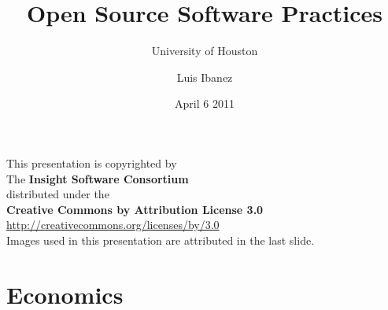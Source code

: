 \documentclass[18pt]{beamer}
\begin{document}
\title[Open Source]{Open Source Software Practices}
\subtitle[UH]{University of Houston}
\author[Luis Ibanez]{Luis Ibanez}
\date[April 2011]{April 6 2011}

\begin{frame}
\titlepage
\end{frame}


{
\begin{frame}[plain]
\center
\begin{center}
This presentation is copyrighted by\\
The \textbf{Insight Software Consortium}\\
\bigskip
distributed under the\\
\textbf{Creative Commons by Attribution License 3.0}\\
\url{http://creativecommons.org/licenses/by/3.0}\\
\bigskip
Images used in this presentation are attributed in the last slide.
\end{center}
\end{frame}
}


\begin{frame}
  \tableofcontents
\end{frame}


{
\begin{frame}[plain]
\end{frame}
}


\part{Economics}
\end{document}
